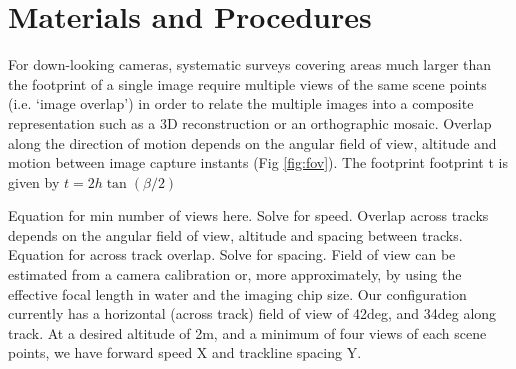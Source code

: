 \section{Materials and Procedures}


For down-looking cameras, systematic surveys covering areas much larger than the footprint of a single image require multiple views of the same scene points (i.e. `image overlap') in order to relate the multiple images into a composite representation such as a 3D reconstruction or an orthographic mosaic. Overlap along the direction of motion depends on the angular field of view, altitude and motion between image capture instants (Fig \ref{fig:fov}). The footprint footprint t is given by $t = 2 h \tan(\beta/2)$

Equation for min number of views here. Solve for speed.
Overlap across tracks depends on the angular field of view, altitude and spacing between tracks. 
Equation for across track overlap. Solve for spacing.
Field of view can be estimated from a camera calibration or, more approximately, by using the effective focal length in water and the imaging chip size. Our configuration currently has a horizontal (across track) field of view of 42deg, and 34deg along track. At a desired altitude of 2m, and a minimum of four views of each scene points, we have forward speed X and trackline spacing Y. 
